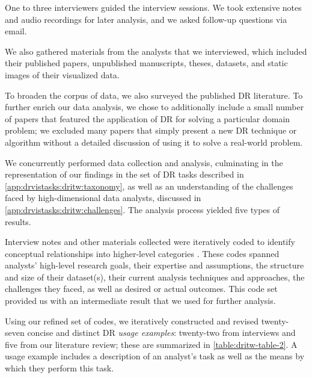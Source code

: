 One to three interviewers guided the interview sessions.
We took extensive notes and audio recordings for later analysis, and we asked follow-up questions via email.

We also gathered materials from the analysts that we interviewed, which included their published papers, unpublished manuscripts, theses, datasets, and static images of their visualized data.

To broaden the corpus of data, we also surveyed the published \ac{DR} literature. 
To further enrich our data analysis, we chose to additionally include a small number of papers that featured the application of \ac{DR} for solving a particular domain problem; we excluded many papers that simply present a new \ac{DR} technique or algorithm without a detailed discussion of using it to solve a real-world problem. 

We concurrently performed data collection and analysis, culminating in the representation of our findings in the set of \ac{DR} tasks described in \autoref{app:drvistasks:dritw:taxonomy}, as well as an understanding of the challenges faced by high-dimensional data analysts, discussed in \autoref{app:drvistasks:dritw:challenges}.
The analysis process yielded five types of results.

Interview notes and other materials collected were iteratively coded to identify conceptual relationships into higher-level categories \cite{Charmaz2006}. 
These codes spanned analysts' high-level research goals, their expertise and assumptions, the structure and size of their dataset(s), their current analysis techniques and approaches, the challenges they faced, as well as desired or actual outcomes. 
This code set provided us with an intermediate result that we used for further analysis.

Using our refined set of codes, we iteratively constructed and revised twenty-seven concise and distinct \ac{DR} {\it usage examples}: twenty-two from interviews and five from our literature review; these are summarized in \autoref{table:dritw-table-2}.
A usage example includes a description of an analyst's task as well as the means by which they perform this task.

